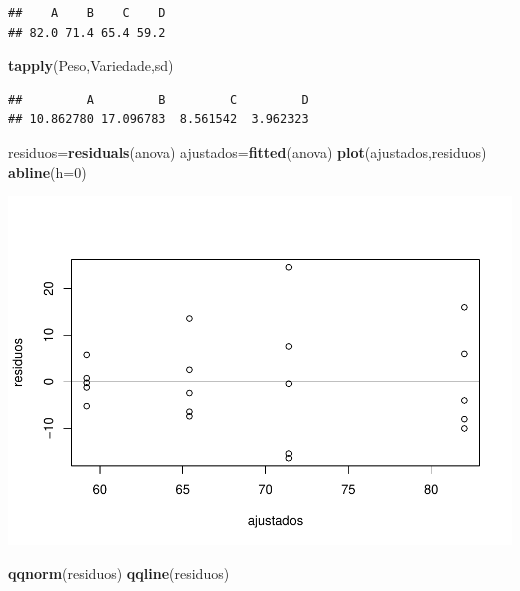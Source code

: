 \documentclass[12pt,brazil,]{book}
\newenvironment{Shaded}{\begin{snugshade}}{\end{snugshade}}
\newcommand{\DataTypeTok}[1]{\textcolor[rgb]{0.13,0.29,0.53}{#1}}
\newcommand{\DecValTok}[1]{\textcolor[rgb]{0.00,0.00,0.81}{#1}}
\newcommand{\KeywordTok}[1]{\textcolor[rgb]{0.13,0.29,0.53}{\textbf{#1}}}
\newcommand{\NormalTok}[1]{#1}
\begin{document}
\begin{verbatim}
##    A    B    C    D 
## 82.0 71.4 65.4 59.2
\end{verbatim}

\begin{Shaded}
\begin{Highlighting}[]
\KeywordTok{tapply}\NormalTok{(Peso,Variedade,sd)}
\end{Highlighting}
\end{Shaded}

\begin{verbatim}
##         A         B         C         D 
## 10.862780 17.096783  8.561542  3.962323
\end{verbatim}

\begin{Shaded}
\begin{Highlighting}[]
\NormalTok{residuos=}\KeywordTok{residuals}\NormalTok{(anova)}
\NormalTok{ajustados=}\KeywordTok{fitted}\NormalTok{(anova)}
\KeywordTok{plot}\NormalTok{(ajustados,residuos)}
\KeywordTok{abline}\NormalTok{(}\DataTypeTok{h=}\DecValTok{0}\NormalTok{)}
\end{Highlighting}
\end{Shaded}

\includegraphics{02-Delinexp_files/figure-latex/unnamed-chunk-7-1.pdf}

\begin{Shaded}
\begin{Highlighting}[]
\KeywordTok{qqnorm}\NormalTok{(residuos)}
\KeywordTok{qqline}\NormalTok{(residuos)}
\end{Highlighting}
\end{Shaded}
\end{document}
